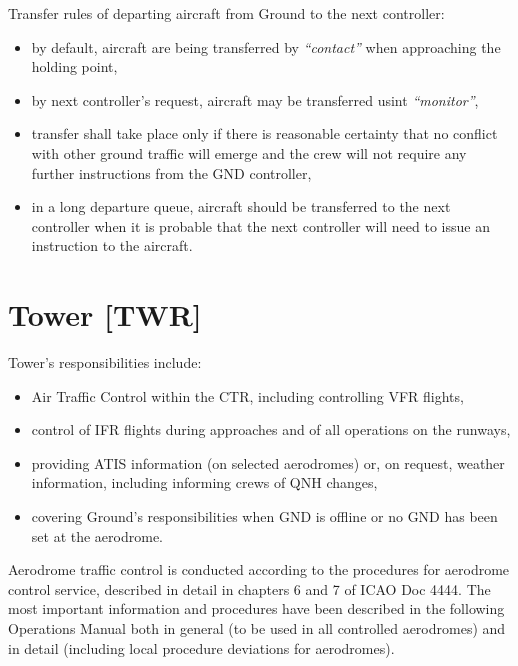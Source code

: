 Transfer rules of departing aircraft from Ground to the next controller:
\begin{itemize}
    \item by default, aircraft are being transferred by \textit{``contact''} when approaching the holding point,
    \item by next controller's request, aircraft may be transferred usint \textit{``monitor''},
    \item transfer shall take place only if there is reasonable certainty that no conflict with other ground traffic will emerge and the crew will not require any further instructions from the GND controller,
    \item in a long departure queue, aircraft should be transferred to the next controller when it is probable that the next controller will need to issue an instruction to the aircraft.
\end{itemize}

\section{Tower [TWR]}

Tower's responsibilities include:
\begin{itemize}
    \item Air Traffic Control within the CTR, including controlling VFR flights,
    \item control of IFR flights during approaches and of all operations on the runways,
    \item providing ATIS information (on selected aerodromes) or, on request, weather information, including informing crews of QNH changes,
    \item covering Ground's responsibilities when GND is offline or no GND has been set at the aerodrome.
\end{itemize}

Aerodrome traffic control is conducted according to the procedures for aerodrome control service, described in detail in chapters 6 and 7 of ICAO Doc 4444. The most important information and procedures have been described in the following Operations Manual both in general (to be used in all controlled aerodromes) and in detail (including local procedure deviations for aerodromes).
